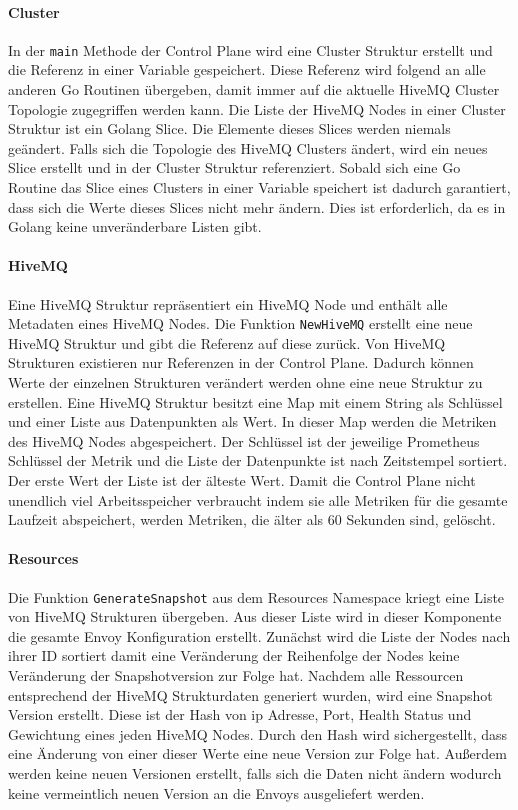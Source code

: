 \paragraph{Cluster}
In der \verb|main| Methode der Control Plane wird eine Cluster Struktur erstellt und die Referenz in einer Variable gespeichert. Diese Referenz wird folgend an alle anderen Go Routinen übergeben, damit immer auf die aktuelle HiveMQ Cluster Topologie zugegriffen werden kann. Die Liste der HiveMQ Nodes in einer Cluster Struktur ist ein Golang Slice. Die Elemente dieses Slices werden niemals geändert. Falls sich die Topologie des HiveMQ Clusters ändert, wird ein neues Slice erstellt und in der Cluster Struktur referenziert. Sobald sich eine Go Routine das Slice eines Clusters in einer Variable speichert ist dadurch garantiert, dass sich die Werte dieses Slices nicht mehr ändern. Dies ist erforderlich, da es in Golang keine unveränderbare Listen gibt.

\paragraph{HiveMQ}
Eine HiveMQ Struktur repräsentiert ein HiveMQ Node und enthält alle Metadaten eines HiveMQ Nodes. Die Funktion \verb|NewHiveMQ| erstellt eine neue HiveMQ Struktur und gibt die Referenz auf diese zurück. Von HiveMQ Strukturen existieren nur Referenzen in der Control Plane. Dadurch können Werte der einzelnen Strukturen verändert werden ohne eine neue Struktur zu erstellen.
Eine HiveMQ Struktur besitzt eine Map mit einem String als Schlüssel und einer Liste aus Datenpunkten als Wert. In dieser Map werden die Metriken des HiveMQ Nodes abgespeichert. Der Schlüssel ist der jeweilige Prometheus Schlüssel der Metrik und die Liste der Datenpunkte ist nach Zeitstempel sortiert. Der erste Wert der Liste ist der älteste Wert. Damit die Control Plane nicht unendlich viel Arbeitsspeicher verbraucht indem sie alle Metriken für die gesamte Laufzeit abspeichert, werden Metriken, die älter als 60 Sekunden sind, gelöscht.

\paragraph{Resources}
Die Funktion \verb|GenerateSnapshot| aus dem Resources Namespace kriegt eine Liste von HiveMQ Strukturen übergeben. Aus dieser Liste wird in dieser Komponente die gesamte Envoy Konfiguration erstellt. Zunächst wird die Liste der Nodes nach ihrer ID sortiert damit eine Veränderung der Reihenfolge der Nodes keine Veränderung der Snapshotversion zur Folge hat. Nachdem alle Ressourcen entsprechend der HiveMQ Strukturdaten generiert wurden, wird eine Snapshot Version erstellt. Diese ist der Hash von \ac{ip} Adresse, Port, Health Status und Gewichtung eines jeden HiveMQ Nodes. Durch den Hash wird sichergestellt, dass eine Änderung von einer dieser Werte eine neue Version zur Folge hat. Au{\ss}erdem werden keine neuen Versionen erstellt, falls sich die Daten nicht ändern wodurch keine vermeintlich neuen Version an die Envoys ausgeliefert werden.

